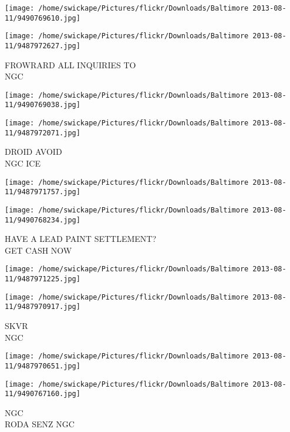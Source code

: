 \documentclass[10pt,letterpaper]{article}
\begin{document}
\texttt{[image: /home/swickape/Pictures/flickr/Downloads/Baltimore 2013-08-11/9490769610.jpg]}

\vspace{0.25in}
\texttt{[image: /home/swickape/Pictures/flickr/Downloads/Baltimore 2013-08-11/9487972627.jpg]}

FROWRARD ALL INQUIRIES TO\\
NGC\\
\pagebreak

\texttt{[image: /home/swickape/Pictures/flickr/Downloads/Baltimore 2013-08-11/9490769038.jpg]}

\vspace{0.25in}
\texttt{[image: /home/swickape/Pictures/flickr/Downloads/Baltimore 2013-08-11/9487972071.jpg]}

DROID AVOID\\
NGC ICE\\
\pagebreak

\texttt{[image: /home/swickape/Pictures/flickr/Downloads/Baltimore 2013-08-11/9487971757.jpg]}

\vspace{0.25in}
\texttt{[image: /home/swickape/Pictures/flickr/Downloads/Baltimore 2013-08-11/9490768234.jpg]}

HAVE A LEAD PAINT SETTLEMENT?\\
GET CASH NOW\\
\pagebreak

\texttt{[image: /home/swickape/Pictures/flickr/Downloads/Baltimore 2013-08-11/9487971225.jpg]}

\vspace{0.25in}
\texttt{[image: /home/swickape/Pictures/flickr/Downloads/Baltimore 2013-08-11/9487970917.jpg]}

SKVR\\
NGC\\
\pagebreak

\texttt{[image: /home/swickape/Pictures/flickr/Downloads/Baltimore 2013-08-11/9487970651.jpg]}

\vspace{0.25in}
\texttt{[image: /home/swickape/Pictures/flickr/Downloads/Baltimore 2013-08-11/9490767160.jpg]}

NGC\\
RODA SENZ NGC\\
\pagebreak
\end{document}
